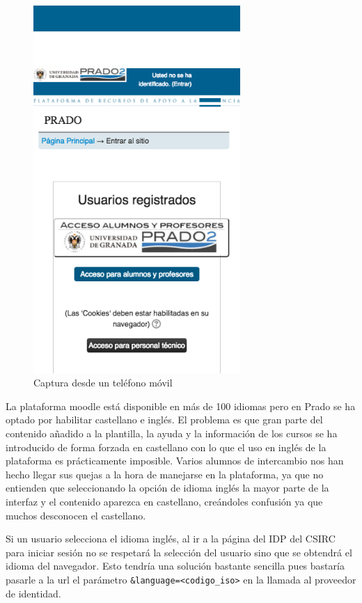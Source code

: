 \bigskip


\begin{figure}[H]
\centering
\includegraphics[width=0.7\textwidth]{../screenshots/capturamovil2}
\caption{Captura desde un teléfono móvil}
\label{fig:capturamovil2}
\end{figure}

\bigskip
La plataforma moodle está disponible en más de 100 idiomas pero en Prado se ha optado por habilitar castellano e inglés. El problema es que gran parte del contenido añadido a la plantilla, la ayuda y la información de los cursos se ha introducido de forma forzada en castellano con lo que el uso en inglés de la plataforma es prácticamente imposible. Varios alumnos de intercambio nos han hecho llegar sus quejas a la hora de manejarse en la plataforma, ya que no entienden que seleccionando la opción de idioma inglés la mayor parte de la interfaz y el contenido aparezca en castellano, creándoles confusión ya que muchos desconocen el castellano.

\bigskip
Si un usuario selecciona el idioma inglés, al ir a la página del IDP del CSIRC para iniciar sesión no se respetará la selección del usuario sino que se obtendrá el idioma del navegador. Esto tendría una solución bastante sencilla pues bastaría pasarle a la url el parámetro \texttt{\&language=<codigo\_iso>} en la llamada al proveedor de identidad.


